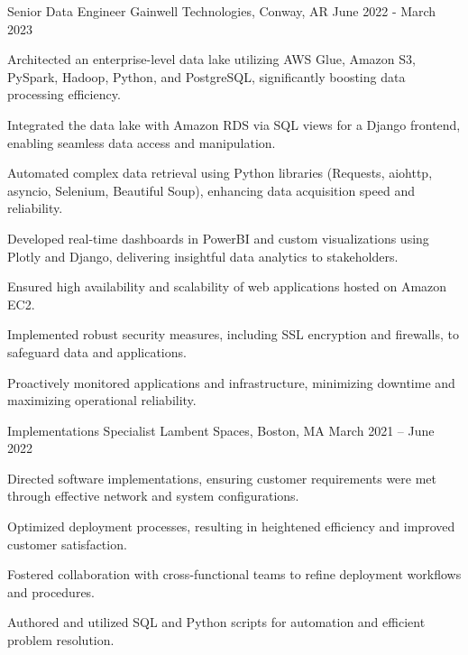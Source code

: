 \begin{cventries}
\cventry
{Senior Data Engineer} %
{Gainwell Technologies, Conway, AR} %
{} %
{June 2022 - March 2023} %
{ %
\begin{cvitems}
\item {Architected an enterprise-level data lake utilizing AWS Glue, Amazon S3, PySpark, Hadoop, Python, and PostgreSQL, significantly boosting data processing efficiency.}
\item {Integrated the data lake with Amazon RDS via SQL views for a Django frontend, enabling seamless data access and manipulation.}
\item {Automated complex data retrieval using Python libraries (Requests, aiohttp, asyncio, Selenium, Beautiful Soup), enhancing data acquisition speed and reliability.}
\item {Developed real-time dashboards in PowerBI and custom visualizations using Plotly and Django, delivering insightful data analytics to stakeholders.}
\item {Ensured high availability and scalability of web applications hosted on Amazon EC2.}
\item {Implemented robust security measures, including SSL encryption and firewalls, to safeguard data and applications.}
\item {Proactively monitored applications and infrastructure, minimizing downtime and maximizing operational reliability.}
\end{cvitems}
}


\cventry
{Implementations Specialist} %
{Lambent Spaces, Boston, MA} %
{} %
{March 2021 – June 2022} %
{ %
\begin{cvitems}
\item {Directed software implementations, ensuring customer requirements were met through effective network and system configurations.}
\item {Optimized deployment processes, resulting in heightened efficiency and improved customer satisfaction.}
\item {Fostered collaboration with cross-functional teams to refine deployment workflows and procedures.}
\item {Authored and utilized SQL and Python scripts for automation and efficient problem resolution.}
\end{cvitems}
}


\end{cventries}
